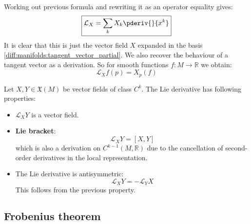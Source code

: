 	\begin{formula}[$\dag$]\label{manifolds:ex:lie_derivative_function}
		Working out previous formula and rewriting it as an operator equality gives:
		\begin{equation}
			\label{manifolds:lie_derivative_function_expansion}
			\boxed{\mathcal{L}_X = \sum_kX_k\pderiv{}{x^k}}
		\end{equation}
		It is clear that this is just the vector field $X$ expanded in the basis \ref{diff:manifolds:tangent_vector_partial}. We also recover the behaviour of a tangent vector as a derivation. So for smooth functions $f:M\rightarrow\mathbb{R}$ we obtain:
		\begin{equation}
			\mathcal{L}_Xf(p) = X_p(f)
		\end{equation}
	\end{formula}
	
	\begin{property}
		Let $X, Y\in\mathfrak{X}(M)$ be vector fields of class $C^k$. The Lie derivative has following properties:
		\begin{itemize}
			\item $\mathcal{L}_XY$ is a vector field.
			\item \textbf{Lie bracket}:
				\begin{equation}
					\label{manifolds:lie_bracket}
					\mathcal{L}_XY = [X, Y]
				\end{equation}
				which is also a derivation on $C^{k-1}(M, \mathbb{R})$ due to the cancellation of second-order derivatives in the local representation.
			\item The Lie derivative is antisymmetric:
				\begin{equation}
					\mathcal{L}_XY = -\mathcal{L}_YX
				\end{equation}
				This follows from the previous property.
		\end{itemize}
	\end{property}
	
\subsection{Frobenius theorem}


